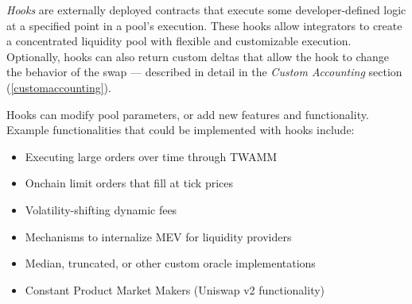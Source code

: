 \documentclass[sigconf,nonacm,prologue,table]{acmart}
\numberwithin{equation}{section}
\theoremstyle{definition}
\theoremstyle{remark}
\begin{document}
\emph{Hooks} are externally deployed contracts that execute some developer-defined logic at a specified point in a pool’s execution. These hooks allow integrators to create a concentrated liquidity pool with flexible and customizable execution. Optionally, hooks can also return custom deltas that allow the hook to change the behavior of the swap — described in detail in the \emph{Custom Accounting} section (\ref{customaccounting}).

Hooks can modify pool parameters, or add new features and functionality. Example functionalities that could be implemented with hooks include: 
\begin{itemize}
\item Executing large orders over time through TWAMM \cite{White2021}
\item Onchain limit orders that fill at tick prices
\item Volatility-shifting dynamic fees
\item Mechanisms to internalize MEV for liquidity providers \cite{adams2024amm}
\item Median, truncated, or other custom oracle implementations
\item Constant Product Market Makers (Uniswap v2 functionality)
\end{itemize}
\end{document}
